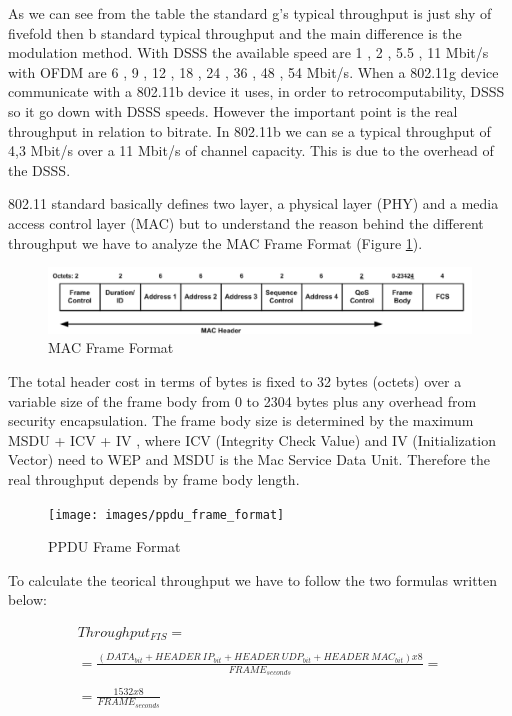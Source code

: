 	As we can see from the table the standard g's typical throughput is just shy of fivefold then b standard typical throughput and the main difference is the modulation method.
	With DSSS the available speed are 1 , 2 , 5.5 , 11 Mbit/s with OFDM are 6 , 9 , 12 , 18 , 24 , 36 , 48 , 54 Mbit/s. When a 802.11g device communicate with a 802.11b device it uses, in order to retrocomputability, DSSS  so it go down with DSSS speeds.
	However the important point is the real throughput in relation to bitrate.
	In 802.11b we can se a typical throughput of 4,3 Mbit/s over a 11 Mbit/s of channel capacity. This is due to the overhead of the DSSS.
	
	802.11 standard basically defines two layer, a physical layer (PHY) and a media access control layer (MAC) but to understand the reason behind the different throughput we have to analyze the MAC Frame Format (Figure \ref{mac_packet}).
	
	\begin{figure}[h!]
		\includegraphics[angle=0, keepaspectratio=true, width=15cm]{images/mac_header2}
		\caption{MAC Frame Format}
		\label{mac_packet}
	\end{figure}
	
	The total header cost in terms of bytes is fixed to 32 bytes (octets) over a variable size of the frame body from 0 to 2304 bytes plus any overhead from security encapsulation. The frame body size is determined by the maximum MSDU + ICV + IV , where ICV (Integrity Check Value) and IV (Initialization Vector) need to WEP and MSDU is the Mac Service Data Unit. Therefore the real throughput depends by frame body length.\\
	
	\begin{figure}[h!]
		\texttt{[image: images/ppdu\_frame\_format]}
		\caption{PPDU Frame Format}
		\label{ppdu_frame_packet}
	\end{figure}
	
	To calculate the teorical throughput we have to follow the two formulas written below:
	
	\begin{gather*}
		Throughput_{FIS} = \\\\
		= \frac{ ( DATA_{bit} + HEADER\ IP_{bit} + HEADER\ UDP_{bit} + HEADER\ MAC_{bit} ) x 8 }{ FRAME_{seconds} } = \\\\
		= \frac{ 1532 x 8 }{  FRAME_{seconds} } \\\\
	\end{gather*}
	

